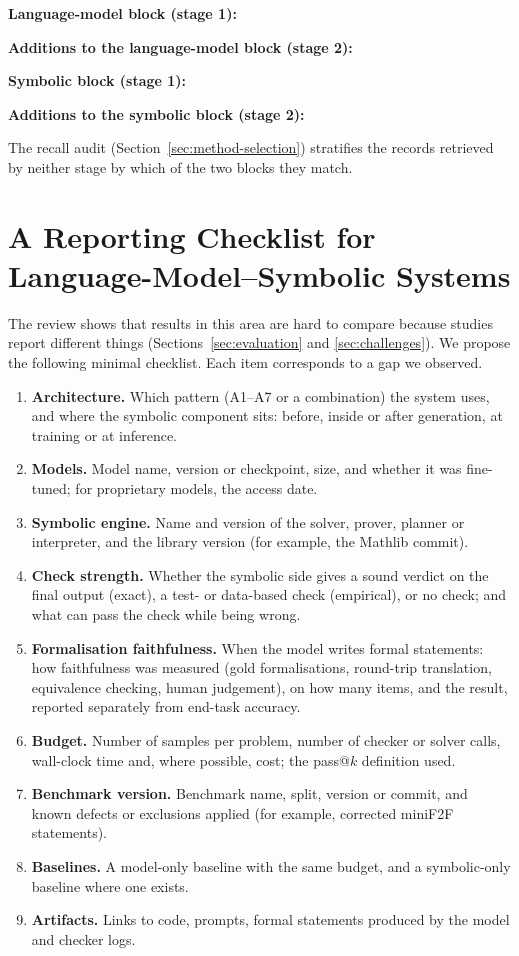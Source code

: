 \noindent\textbf{Language-model block (stage 1):}


\noindent\textbf{Additions to the language-model block (stage 2):}


\noindent\textbf{Symbolic block (stage 1):}


\noindent\textbf{Additions to the symbolic block (stage 2):}


The recall audit (Section~\ref{sec:method-selection}) stratifies the records retrieved by neither stage by which of the two blocks they match.

\section{A Reporting Checklist for Language-Model--Symbolic Systems}
\label{app:checklist}
The review shows that results in this area are hard to compare because studies report different things (Sections~\ref{sec:evaluation} and \ref{sec:challenges}). We propose the following minimal checklist. Each item corresponds to a gap we observed.
\begin{enumerate}
  \item \textbf{Architecture.} Which pattern (A1--A7 or a combination) the system uses, and where the symbolic component sits: before, inside or after generation, at training or at inference.
  \item \textbf{Models.} Model name, version or checkpoint, size, and whether it was fine-tuned; for proprietary models, the access date.
  \item \textbf{Symbolic engine.} Name and version of the solver, prover, planner or interpreter, and the library version (for example, the Mathlib commit).
  \item \textbf{Check strength.} Whether the symbolic side gives a sound verdict on the final output (exact), a test- or data-based check (empirical), or no check; and what can pass the check while being wrong.
  \item \textbf{Formalisation faithfulness.} When the model writes formal statements: how faithfulness was measured (gold formalisations, round-trip translation, equivalence checking, human judgement), on how many items, and the result, reported separately from end-task accuracy.
  \item \textbf{Budget.} Number of samples per problem, number of checker or solver calls, wall-clock time and, where possible, cost; the pass@$k$ definition used.
  \item \textbf{Benchmark version.} Benchmark name, split, version or commit, and known defects or exclusions applied (for example, corrected miniF2F statements).
  \item \textbf{Baselines.} A model-only baseline with the same budget, and a symbolic-only baseline where one exists.
  \item \textbf{Artifacts.} Links to code, prompts, formal statements produced by the model and checker logs.
\end{enumerate}


